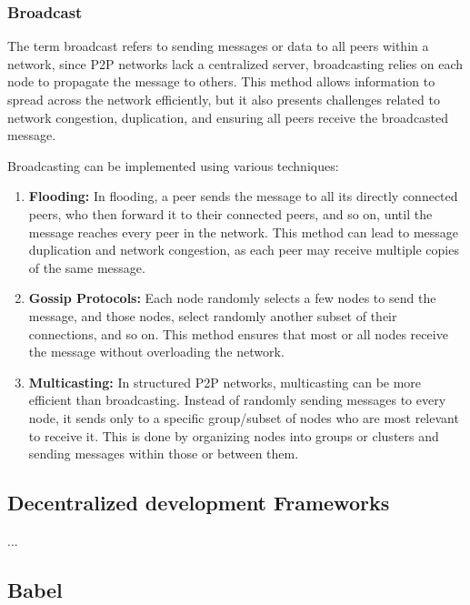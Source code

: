 \subsubsection{Broadcast}
\label{sec:Broadcast}

The term broadcast refers to sending messages or data to all peers within a network, since P2P networks lack a centralized server, broadcasting relies on each node to propagate the message to others.
This method allows information to spread across the network efficiently, but it also presents challenges related to network congestion, duplication, and ensuring all peers receive the broadcasted message.

Broadcasting can be implemented using various techniques:

\begin{enumerate}

  \item \textbf{Flooding:} In flooding, a peer sends the message to all its directly connected peers, who then forward it to their connected peers, and so on, until the message reaches every peer in the network. This method can lead to message duplication and network congestion, as each peer may receive multiple copies of the same message.
  \item \textbf{Gossip Protocols:} Each node randomly selects a few nodes to send the message, and those nodes, select randomly another subset of their connections, and so on. This method ensures that most or all nodes receive the message without overloading the network.
  \item \textbf{Multicasting:} In structured P2P networks, multicasting can be more efficient than broadcasting. Instead of randomly sending messages to every node, it sends only to a specific group/subset of nodes who are most relevant to receive it. This is done by organizing nodes into groups or clusters and sending messages within those or between them.

\end{enumerate}



\subsection{Decentralized development Frameworks}
\label{sub:decentralized_development_frameworks}

...

\subsection{Babel}
\label{sub:babel}

